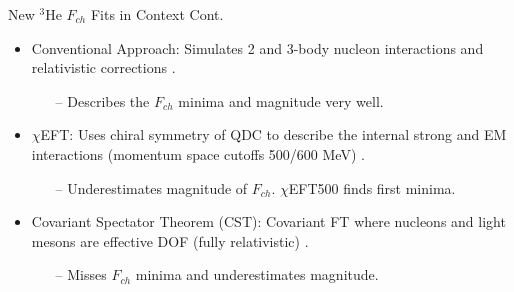 \documentclass[10pt]{beamer}
\begin{document}
\begin{frame}[fragile]{New $^3$He $F_{ch}$ Fits in Context Cont.}
	\begin{itemize}
		\pause
		\item \alert{Conventional Approach}: Simulates 2 and 3-body nucleon interactions and relativistic corrections \cite{Article:Marcucci}.
		\begin{itemize}
			\item[--] \alert{Describes the $F_{ch}$ minima and magnitude very well}.
		\end{itemize}
		\pause
		\item \alert{$\chi$EFT}: Uses chiral symmetry of QDC to describe the internal strong and EM interactions (momentum space cutoffs 500/600 MeV) \cite{Article:Marcucci}.
		\begin{itemize}
			\item[--] \alert{Underestimates magnitude of $F_{ch}$}. \alert{$\chi$EFT500 finds first minima}.
		\end{itemize}
		\pause
		\item \alert{Covariant Spectator Theorem (CST)}: Covariant FT where nucleons and light mesons are effective DOF (fully relativistic) \cite{Article:Marcucci}.
		\begin{itemize}
			\item[--] \alert{Misses $F_{ch}$ minima and underestimates magnitude}.
		\end{itemize}
	\end{itemize}

\end{frame}
\end{document}

